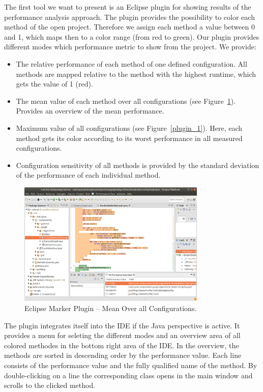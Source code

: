 The first tool we want to present is an Eclipse plugin for showing results of the performance analysis approach. The plugin provides the possibility to color each method of the open project. Therefore we assign each method a value between 0 and 1, which maps then to a color range (from red to green). Our plugin provides different modes which performance metric to show from the project. We provide:
\begin{itemize}
	\item The relative performance of each method of one defined configuration. All methods are mapped relative to the method with the highest runtime, which gets the value of 1 (red).
	\item The mean value of each method over all configurations (see Figure~\ref{plugin_2}). Provides an overview of the mean performance.
	\item Maximum value of all configurations (see Figure~\ref{plugin_1}). Here, each method gets its color according to its worst performance in all measured configurations.
	\item Configuration sensitivity of all methods is provided by the standard deviation of the performance of each individual method.
\end{itemize}


\begin{figure}[h]
  \centering
  \includegraphics[width=0.8\textwidth]{images/eclipse2}
  \caption{Eclipse Marker Plugin -- Mean Over all Configurations.}
  \label{plugin_2}
\end{figure}


The plugin integrates itself into the IDE if the Java perspective is active. It provides a menu for seleting the different modes and an overview area of all colored methodes in the bottom right area of the IDE. In the overview, the methods are sorted in descending order by the performance value. Each line consists of the performance value and the fully qualified name of the method. By double-clicking on a line the corresponding class opens in the main window and scrolls to the clicked method. 


